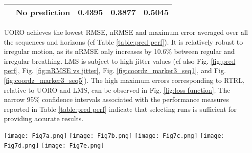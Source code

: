 \documentclass[twocolumn,a4paper]{svjour3} \sloppy          \smartqed
\begin{document}
\begin{table*}[tb!]
\begin{center}
\begin{tabular}{lllll}
          & No prediction   & 0.4395 & 0.3877 & 0.5045 \\                            
\hline
\end{tabular}
\end{center}
\caption{Comparison of the forecasting performance of each algorithm. Each error value corresponds to the average of a given performance measure of the test set over the sequences considered and the horizon values between 0.1s and 2.0s. The 95\% mean confidence intervals associated with the RNNs are calculated assuming that the error distribution is Gaussian (Eq. \ref{eq:conf interval mu}).}
\label{table:pred perf}
\end{table*}


UORO achieves the lowest RMSE, nRMSE and maximum error averaged over all the sequences and horizons (cf Table \ref{table:pred perf}). It is relatively robust to irregular motion, as its nRMSE only increases by 10.6\% between regular and irregular breathing. LMS is subject to high jitter values (cf also Fig. \ref{fig:pred perf}, Fig. \ref{fig:nRMSE vs jitter}, Fig. \ref{fig:coordz_marker3_seq1}, and Fig. \ref{fig:coordz_marker3_seq5}). The high maximum errors corresponding to RTRL, relative to UORO and LMS, can be observed in Fig. \ref{fig:loss function}. The narrow 95\% confidence intervals associated with the performance measures reported in Table \ref{table:pred perf} indicate that selecting  runs is sufficient for providing accurate results.

\begin{figure*}[tb!]
    \centering
    \texttt{[image: Fig7a.png]}\qquad
    \texttt{[image: Fig7b.png]}\qquad
    \texttt{[image: Fig7c.png]}\qquad
    \texttt{[image: Fig7d.png]}\qquad
    \texttt{[image: Fig7e.png]}\caption{Forecasting performance of each algorithm as a function of the prediction horizon. Each point corresponds to the average of one performance measure of the test set across the 9 sequences. }
    \label{fig:pred perf}
\end{figure*}
\end{document}
